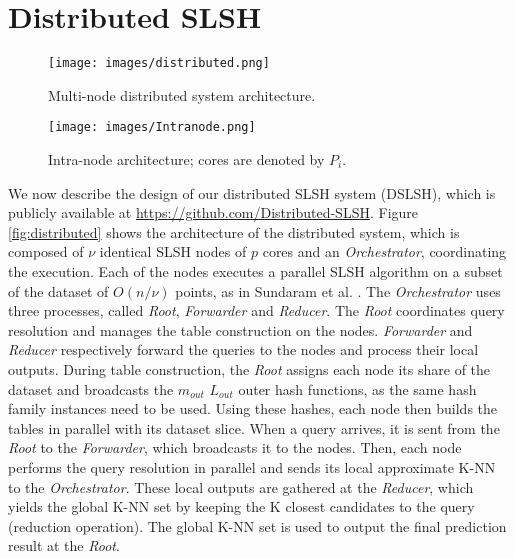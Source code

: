 \documentclass{article}
\begin{document}
\section{Distributed SLSH}
\label{system}


\begin{figure}[b]
	\begin{minipage}{.45\textwidth}
		\centering
		\texttt{[image: images/distributed.png]}
		\caption{Multi-node distributed system architecture.}
		\label{fig:distributed}
	\end{minipage} \hspace{5pt}
	\begin{minipage}{.45\textwidth}
		\centering
		\texttt{[image: images/Intranode.png]}
		\caption{Intra-node architecture; cores are denoted by $P_i$.}
		\label{fig:intranode}
	\end{minipage}
\end{figure}

We now describe the design of our distributed SLSH system (DSLSH), which is publicly available at \url{https://github.com/Distributed-SLSH}.
Figure \ref{fig:distributed} shows the architecture of the distributed system, which is composed of $\nu$ identical SLSH nodes of $p$ cores and an \textit{Orchestrator}, coordinating the execution. Each of the nodes executes a parallel SLSH algorithm on a subset of the dataset of $O(n/\nu)$ points, as in Sundaram et al. \cite{Sundaram}.
The \textit{Orchestrator} uses three processes, called \textit{Root}, \textit{Forwarder} and \textit{Reducer}. 
The \textit{Root} coordinates query resolution and manages the table construction on the nodes.
\textit{Forwarder} and \textit{Reducer} respectively forward the queries to the nodes and process their local outputs. During table construction, the \textit{Root} assigns each node its share of the dataset and broadcasts the $m_{out}$ $L_{out}$ outer hash functions, as the same hash family instances need to be used. Using these hashes, each node then builds the tables in parallel with its dataset slice. 
When a query arrives, it is sent from the \textit{Root} to the \textit{Forwarder}, which broadcasts it to the nodes. Then, each node performs the query resolution in parallel and sends its local approximate K-NN to the \textit{Orchestrator}. These local outputs are gathered at the \textit{Reducer}, which yields the global K-NN set by keeping the K closest candidates to the query (reduction operation). The global K-NN set is used to output the final prediction result at the \textit{Root}.
\end{document}
